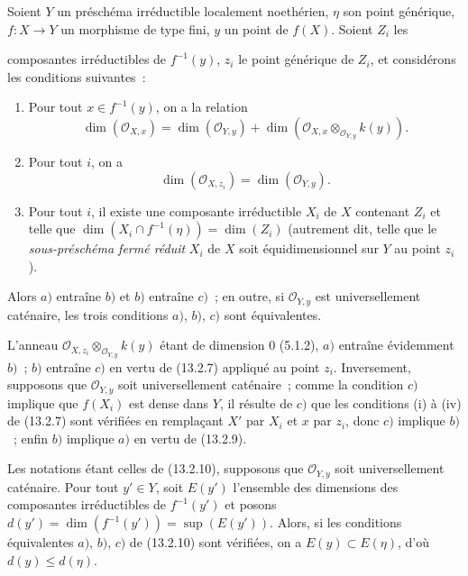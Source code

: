 \begin{proposition}[13.2.10]
\label{IV.13.2.10-fr}
Soient $Y$ un préschéma irréductible localement noethérien, $\eta$ son point
générique, $f:X\to Y$ un morphisme de type fini, $y$ un point de $f(X)$.
Soient $Z_i$ les

composantes irréductibles de $f^{-1}(y)$, $z_i$ le point générique de $Z_i$,
et considérons les conditions suivantes~:
\begin{enumerate}[label=\emph{\alph*)}]
  \item Pour tout $x\in f^{-1}(y)$, on a la relation
  \[
  \tag{13.2.10.1}
  \label{IV.13.2.10.1-fr}
    \dim(\mathcal O_{X,x})=\dim(\mathcal O_{Y,y})
    +\dim(\mathcal O_{X,x}\otimes_{\mathcal O_{Y,y}}k(y)).
  \]
  \item Pour tout $i$, on a
  \[
  \tag{13.2.10.2}
  \label{IV.13.2.10.2-fr}
    \dim(\mathcal O_{X,z_i})=\dim(\mathcal O_{Y,y}).
  \]
  \item Pour tout $i$, il existe une composante irréductible $X_i$ de $X$
  contenant $Z_i$ et telle que
  $\dim(X_i\cap f^{-1}(\eta))=\dim(Z_i)$ (autrement dit, telle que le
  \emph{sous-préschéma fermé réduit} $X_i$ de $X$ soit équidimensionnel sur $Y$
  au point $z_i$).
\end{enumerate}
Alors $a)$ entraîne $b)$ et $b)$ entraîne $c)$~; en outre, si
$\mathcal O_{Y,y}$ est universellement caténaire, les trois conditions $a)$,
$b)$, $c)$ sont équivalentes.
\end{proposition}

L'anneau $\mathcal O_{X,z_i}\otimes_{\mathcal O_{Y,y}}k(y)$ étant de dimension
$0$ (5.1.2), $a)$ entraîne évidemment $b)$~; $b)$ entraîne $c)$ en vertu de
(13.2.7) appliqué au point $z_i$. Inversement, supposons que
$\mathcal O_{Y,y}$ soit universellement caténaire~; comme la condition $c)$
implique que $f(X_i)$ est dense dans $Y$, il résulte de $c)$ que les conditions
(i) à (iv) de (13.2.7) sont vérifiées en remplaçant $X'$ par $X_i$ et $x$ par
$z_i$, donc $c)$ implique $b)$~; enfin $b)$ implique $a)$ en vertu de
(13.2.9).

\begin{corollary}[13.2.11]
\label{IV.13.2.11-fr}
Les notations étant celles de (13.2.10), supposons que $\mathcal O_{Y,y}$ soit
universellement caténaire. Pour tout $y'\in Y$, soit $E(y')$ l'ensemble des
dimensions des composantes irréductibles de $f^{-1}(y')$ et posons
$d(y')=\dim(f^{-1}(y'))=\sup(E(y'))$. Alors, si les conditions équivalentes
$a)$, $b)$, $c)$ de (13.2.10) sont vérifiées, on a
$E(y)\subset E(\eta)$, d'où $d(y)\leq d(\eta)$.
\end{corollary}

